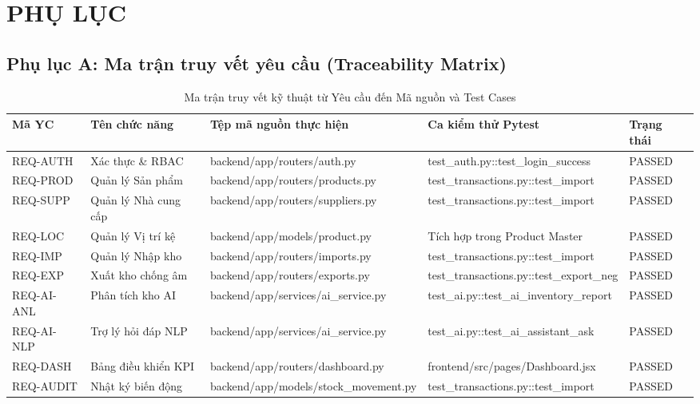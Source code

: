 \chapter*{PHỤ LỤC}

\section*{Phụ lục A: Ma trận truy vết yêu cầu (Traceability Matrix)}

\begin{table}[h!]
\centering
\caption{Ma trận truy vết kỹ thuật từ Yêu cầu đến Mã nguồn và Test Cases}
\begin{tabular}{|l|l|p{4.5cm}|p{5cm}|l|}
\hline
\rowcolor{tablehead}
\textbf{Mã YC} & \textbf{Tên chức năng} & \textbf{Tệp mã nguồn thực hiện} & \textbf{Ca kiểm thử Pytest} & \textbf{Trạng thái} \\ \hline
REQ-AUTH & Xác thực \& RBAC & backend/app/routers/auth.py & test\_auth.py::test\_login\_success & PASSED \\ \hline
REQ-PROD & Quản lý Sản phẩm & backend/app/routers/products.py & test\_transactions.py::test\_import & PASSED \\ \hline
REQ-SUPP & Quản lý Nhà cung cấp & backend/app/routers/suppliers.py & test\_transactions.py::test\_import & PASSED \\ \hline
REQ-LOC & Quản lý Vị trí kệ & backend/app/models/product.py & Tích hợp trong Product Master & PASSED \\ \hline
REQ-IMP & Quản lý Nhập kho & backend/app/routers/imports.py & test\_transactions.py::test\_import & PASSED \\ \hline
REQ-EXP & Xuất kho chống âm & backend/app/routers/exports.py & test\_transactions.py::test\_export\_neg & PASSED \\ \hline
REQ-AI-ANL & Phân tích kho AI & backend/app/services/ai\_service.py & test\_ai.py::test\_ai\_inventory\_report & PASSED \\ \hline
REQ-AI-NLP & Trợ lý hỏi đáp NLP & backend/app/services/ai\_service.py & test\_ai.py::test\_ai\_assistant\_ask & PASSED \\ \hline
REQ-DASH & Bảng điều khiển KPI & backend/app/routers/dashboard.py & frontend/src/pages/Dashboard.jsx & PASSED \\ \hline
REQ-AUDIT & Nhật ký biến động & backend/app/models/stock\_movement.py & test\_transactions.py::test\_import & PASSED \\ \hline
\end{tabular}
\end{table}

